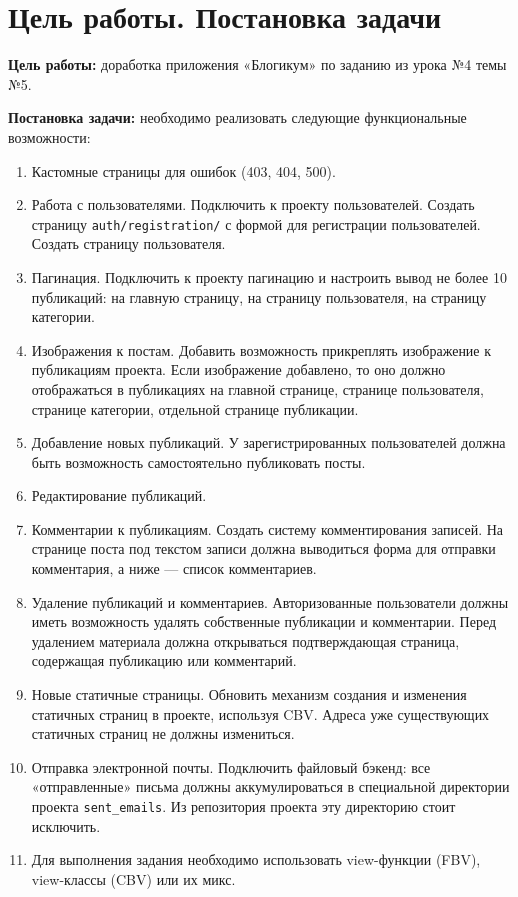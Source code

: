 \documentclass[bachelor, och, pract]{../SCWorks}
\begin{document}
\section{Цель работы. Постановка задачи}

\textbf{Цель работы:} доработка приложения «Блогикум» по заданию из урока №4 темы №5.


\textbf{Постановка задачи:} необходимо реализовать следующие функциональные возможности:

\begin{enumerate}
    \item Кастомные страницы для ошибок (403, 404, 500).
    \item Работа с пользователями. Подключить к проекту пользователей. Создать страницу \texttt{auth/registration/} с формой для регистрации пользователей. Создать страницу пользователя.
    \item Пагинация. Подключить к проекту пагинацию и настроить вывод не более 10 публикаций: на главную страницу, на страницу пользователя, на страницу категории.
    \item Изображения к постам. Добавить возможность прикреплять изображение к публикациям проекта. Если изображение добавлено, то оно должно отображаться в публикациях на главной странице, странице пользователя, странице категории, отдельной странице публикации.
    \item Добавление новых публикаций. У зарегистрированных пользователей должна быть возможность самостоятельно публиковать посты.
    \item Редактирование публикаций.
    \item Комментарии к публикациям. Создать систему комментирования записей. На странице поста под текстом записи должна выводиться форма для отправки комментария, а ниже — список комментариев.
    \item Удаление публикаций и комментариев. Авторизованные пользователи должны иметь возможность удалять собственные публикации и комментарии. Перед удалением материала должна открываться подтверждающая страница, содержащая публикацию или комментарий.
    \item Новые статичные страницы. Обновить механизм создания и изменения статичных страниц в проекте, используя CBV. Адреса уже существующих статичных страниц не должны измениться.
    \item Отправка электронной почты. Подключить файловый бэкенд: все «отправленные» письма должны аккумулироваться в специальной директории проекта \texttt{sent\_emails}. Из репозитория проекта эту директорию стоит исключить.
    \item Для выполнения задания необходимо использовать view-функции (FBV), view-классы (CBV) или их микс.
\end{enumerate}
\end{document}
